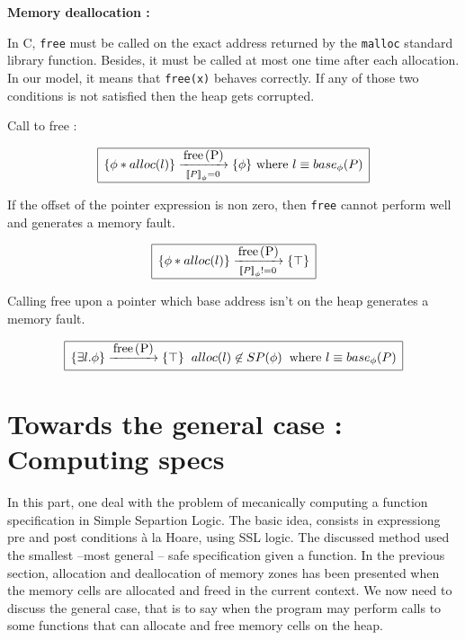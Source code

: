 \documentclass[a4paper,twoside,12pt]{report}
\newcommand{\Sp}[1]{SP(#1)} %
\newcommand{\Alloc}[1]{alloc(#1)}
\newcommand{\Emp}{\lstinline{Emp}}
\newcommand{\Unsep}[0]{\ast}
\newcommand{\Sep}[2]{#1 \Unsep #2}
\newcommand{\Andpure}[2]{ #1 \wedge #2}
\newcommand{\Pointsto}[2]{ #1 \mapsto #2}
\newcommand{\Formula}[2]{ #1  \updownarrow #2}
\newcommand{\base}[2]{base_{#1}(#2)}
\newcommand{\transmodel}[4]{\lbrace #1 \rbrace \arrow{#2}{#3} \lbrace #4 \rbrace }
\newcommand{\ptrbase}[1]{{#1}_{base}}
\newcommand{\ptroffset}[1]{{#1}_{off}}
\newcommand{\seq}[0]{\equiv} %
\newcommand{\interpa}[2]{\sem{#2}_{#1}}
\begin{document}
%
%
%
%
\textbf{Memory deallocation :}

In C, \lstinline!free! must be called on the exact address returned by the
\lstinline!malloc! standard library function. Besides, it must be called at most one time after each allocation.
In our model, it means that \lstinline!free(x)! behaves correctly. If any of those two conditions is not satisfied then the heap gets corrupted.

Call to free :

$$
\begin{array}{|l|}
\hline
\transmodel{\Sep{\phi}{\Alloc{l}}}{\mbox{\lstinline!free(P)!}}{
\interpa{\phi}{P}=0}{\phi} \mbox{ where } l\seq\base{\phi}{P} \\
\hline
\end{array}
$$

If the offset of the pointer expression is non zero, then \lstinline!free!
cannot perform well and generates a memory fault.

$$
\begin{array}{|l|}
\hline
\transmodel{\Sep{\phi}{\Alloc{l}}}{\mbox{\lstinline!free(P)!}}{
\interpa{\phi}{P}!=0}{\top} \\
\hline
\end{array}
$$

Calling free upon a pointer which base address isn't on the heap generates
a memory fault.

$$
\begin{array}{|l|}
\hline
\transmodel{\exists l. \phi}{\mbox{\lstinline!free(P)!}}{}{\top} \gspace \Alloc{l}\not\in \Sp{\phi} \gspace \mbox{where }l\seq\base{\phi}{P} \\
\hline
\end{array}
$$



\chapter{Towards the general case : Computing specs}

In this part, one deal with the problem of mecanically computing a function specification in  Simple Separtion Logic. The basic idea, consists in expressiong pre and post conditions \`{a} la Hoare, using SSL logic.
The discussed method used the smallest --most general -- safe specification given a function. In the previous section, allocation and deallocation of
memory zones has been presented when the memory cells are allocated and freed 
in the current context. We now need to discuss the general case, that is to
say when the program may perform calls to some functions that can allocate and
free memory cells on the heap.
\end{document}
